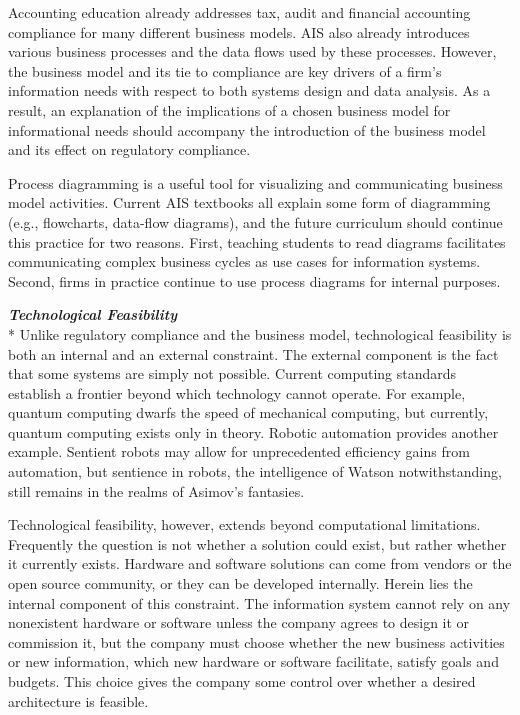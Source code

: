\documentclass[12pt]{article}
\newcommand{\SubSubSection}[1]{{\centering{}\normalsize{}\textbf{\emph{#1}}}\\*\indent{}}
\begin{document}
Accounting education already addresses tax, audit and financial accounting compliance for many different business models. AIS also already introduces various business processes and the data flows used by these processes. However, the business model and its tie to compliance are key drivers of a firm's information needs with respect to both systems design and data analysis. As a result, an explanation of the implications of a chosen business model for informational needs should accompany the introduction of the business model and its effect on regulatory compliance.

Process diagramming is a useful tool for visualizing and communicating business model activities. Current AIS textbooks all explain some form of diagramming (e.g., flowcharts, data-flow diagrams), and the future curriculum should continue this practice for two reasons. First, teaching students to read diagrams facilitates communicating complex business cycles as use cases for information systems. Second, firms in practice continue to use process diagrams for internal purposes.

\SubSubSection{Technological Feasibility}
Unlike regulatory compliance and the business model, technological feasibility is both an internal and an external constraint. The external component is the fact that some systems are simply not possible. Current computing standards establish a frontier beyond which technology cannot operate. For example, quantum computing dwarfs the speed of mechanical computing, but currently, quantum computing exists only in theory. Robotic automation provides another example. Sentient robots may allow for unprecedented efficiency gains from automation, but sentience in robots, the intelligence of Watson notwithstanding, still remains in the realms of Asimov's fantasies.

Technological feasibility, however, extends beyond computational limitations. Frequently the question is not whether a solution could exist, but rather whether it currently exists. Hardware and software solutions can come from vendors or the open source community, or they can be developed internally. Herein lies the internal component of this constraint. The information system cannot rely on any nonexistent hardware or software unless the company agrees to design it or commission it, but the company must choose whether the new business activities or new information, which new hardware or software facilitate, satisfy goals and budgets. This choice gives the company some control over whether a desired architecture is feasible.
\end{document}
